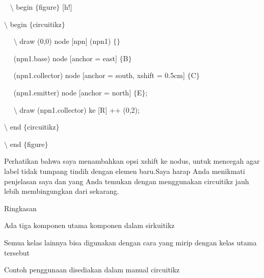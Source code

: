 \noindent 
~ $\setminus$ begin $ \{ $figure$ \} $ [h!]
\par


\noindent 
 $\setminus$ begin $ \{ $circuitikz$ \} $
\par


\noindent 
~~ $\setminus$ draw (0,0) node [npn] (npn1) $ \{ $$ \} $
\par


\noindent 
~~ (npn1.base) node [anchor = east] $ \{ $B$ \} $
\par


\noindent 
~~ (npn1.collector) node [anchor = south, xshift = 0.5cm] $ \{ $C$ \} $
\par


\noindent 
~~ (npn1.emitter) node [anchor = north] $ \{ $E$ \} $;
\par


\noindent 
~~ $\setminus$ draw (npn1.collector) ke [R] ++ (0,2);
\par


\noindent 
 $\setminus$ end $ \{ $circuitikz$ \} $
\par


\noindent 
 $\setminus$ end $ \{ $figure$ \} $ 
\par


\noindent 
Perhatikan bahwa saya menambahkan opsi xshift ke nodus, untuk mencegah agar label tidak tumpang tindih dengan elemen baru.Saya harap Anda menikmati penjelasan saya dan yang Anda temukan dengan menggunakan circuitikz jauh lebih membingungkan dari sekarang.
\par


\noindent 
Ringkasan
\par


\noindent 
Ada tiga komponen utama komponen dalam sirkuitikz
\par


\noindent 
Semua kelas lainnya bisa digunakan dengan cara yang mirip dengan kelas utama tersebut
\par


\noindent 
Contoh penggunaan disediakan dalam manual circuitikz
\par
